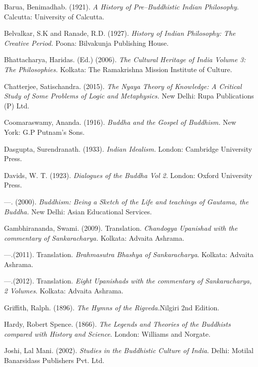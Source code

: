 \begin{thebibliography}{99}
\itemsep=1pt
 Barua, Benimadhab. (1921).\textit{ A History of Pre–Buddhistic Indian Philosophy}. Calcutta: University of Calcutta.

  Belvalkar, S.K and Ranade, R.D. (1927). \textit{History of Indian Philosophy: The Creative Period.} Poona: Bilvakunja Publishing House.

  Bhattacharya, Haridas. (Ed.) (2006). \textit{The Cultural Heritage of India Volume 3: The Philosophies.} Kolkata: The Ramakrishna Mission Institute of Culture.

  Chatterjee, Satischandra. (2015). \textit{The Nyaya Theory of Knowledge: A Critical Study of Some Problems of Logic and Metaphysics.} New Delhi: Rupa Publications (P) Ltd.

  Coomaraswamy, Ananda. (1916). \textit{Buddha and the Gospel of Buddhism.} New York: G.P Putnam’s Sons.

  Dasgupta, Surendranath. (1933).\textit{ Indian Idealism.} London: Cambridge University Press.

  Davids, W. T. (1923). \textit{Dialogues of the Buddha Vol 2.} London: Oxford University Press.

  —. (2000). \textit{Buddhism: Being a Sketch of the Life and teachings of Gautama, the Buddha.} New Delhi: Asian Educational Services.

  Gambhirananda, Swami. (2009). Translation. \textit{Chandogya Upanishad with the commentary of Sankaracharya.} Kolkata: Advaita Ashrama.

  —.(2011). Translation. \textit{Brahmasutra Bhashya of Sankaracharya}. Kolkata: Advaita Ashrama.

  —.(2012). Translation. \textit{Eight Upanishads with the commentary of Sankaracharya, 2 Volumes}. Kolkata: Advaita Ashrama.

  Griffith, Ralph. (1896). \textit{The Hymns of the Rigveda.}Nilgiri 2nd Edition.

  Hardy, Robert Spence. (1866). \textit{The Legends and Theories of the Buddhists compared with History and Science}. London: Williams and Norgate.

  Joshi, Lal Mani. (2002). \textit{Studies in the Buddhistic Culture of India}. Delhi: Motilal Banarsidass Publishers Pvt. Ltd.


\end{thebibliography}
